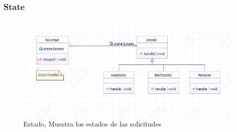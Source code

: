 \subsubsection{State}
\begin{figure}[th!]
	\centering
	\includegraphics[width=1.2\linewidth]{uml/Patrones/Estado}
	\caption{Estado, Muestra los estados de las solicitudes}
	\label{fig:Estado}
\end{figure}

\clearpage






